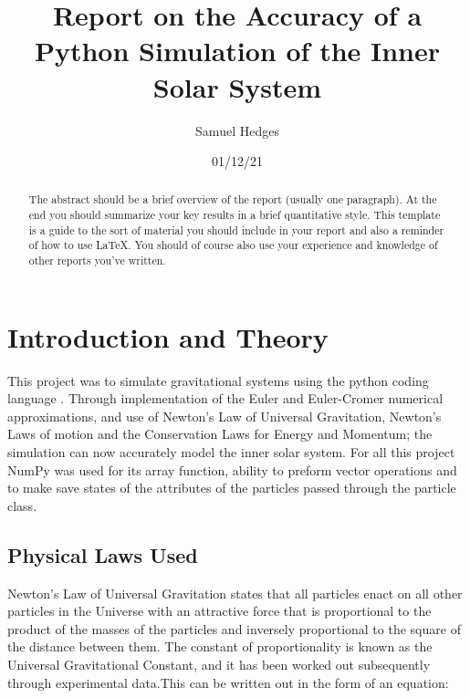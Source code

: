 \documentclass[a4paper,10pt]{article}
\begin{document}
\begin{figure}
\end{figure}




\title{Report on the Accuracy of a Python Simulation of the Inner Solar System  }
\author{Samuel Hedges}
\date{01/12/21}
 
\begin{abstract}
\vspace*{1.0cm}
        The abstract should be a brief overview of the report (usually one paragraph). 
        At the end you should summarize your key results in a brief quantitative style. 
		This template is a guide to the sort of material you should include in your report 
		and also a reminder of how to use LaTeX. You should of course also use your experience 
		and knowledge of other reports you've written.
\vspace*{1.0cm}
\end{abstract}




\section{Introduction and Theory}
This project was to simulate gravitational systems using the python coding language \cite{Python}. Through implementation of the Euler \cite{Euler} and Euler-Cromer \cite{Euler-Cromer} numerical approximations, and use of Newton's Law of Universal Gravitation\cite{Universal Grav}, Newton's Laws of motion\cite{university physics} and the Conservation Laws for Energy and Momentum; the simulation can now accurately model the inner solar system. For all this project NumPy was used for its array function, ability to preform vector operations and to make save states of the attributes of the particles passed through the particle class. \cite{NumPy}

\subsection{Physical Laws Used}
Newton's Law of Universal Gravitation states that all particles enact on all other particles in the Universe with an attractive force that is proportional to the product of the masses of the particles and inversely proportional to the square of the distance between them. The constant of proportionality is known as the Universal Gravitational Constant, and it has been worked out subsequently through experimental data.This can be written out in the form of an equation:
\end{document}
